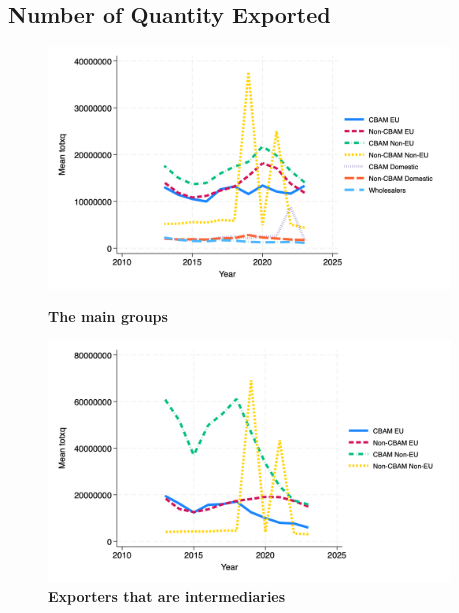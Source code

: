 \documentclass{article}
\begin{document}
\subsection{Number of Quantity Exported}
\begin{figure}[H]
\centering
\includegraphics[width=0.95\textwidth]{totxq_main_groups.png}
\caption{\textbf{The main groups}}
\includegraphics[width=0.95\textwidth]{totxq_ei.png}
\caption{\textbf{Exporters that are intermediaries}}
\end{figure}
\end{document}
